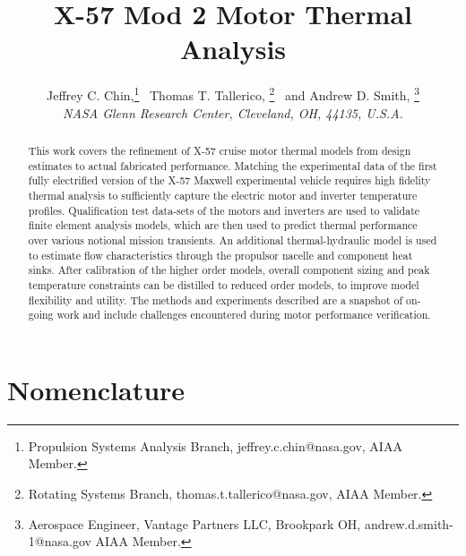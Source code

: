 \documentclass[]{aiaa-tc}%
\title{X-57 Mod 2 Motor Thermal Analysis}
\author{
  Jeffrey C. Chin,\thanks{Propulsion Systems Analysis Branch, jeffrey.c.chin@nasa.gov, AIAA Member.} \
  Thomas T. Tallerico, \thanks{Rotating Systems Branch, thomas.t.tallerico@nasa.gov, AIAA Member.} \
  and Andrew D. Smith, \thanks{Aerospace Engineer, Vantage Partners LLC, Brookpark OH, andrew.d.smith-1@nasa.gov AIAA Member.} \\
  {\normalsize \itshape NASA Glenn Research Center, Cleveland, OH, 44135, U.S.A.} }
\begin{document}
\maketitle

\begin{abstract}

This work covers the refinement of X-57 cruise motor thermal models from design estimates to actual fabricated performance. Matching the experimental data of the first fully electrified version of the X-57 Maxwell experimental vehicle requires high fidelity thermal analysis to sufficiently capture the electric motor and inverter temperature profiles. Qualification test data-sets of the motors and inverters are used to validate finite element analysis models, which are then used to predict thermal performance over various notional mission transients. An additional thermal-hydraulic model is used to estimate flow characteristics through the propulsor nacelle and component heat sinks. After calibration of the higher order models, overall component sizing and peak temperature constraints can be distilled to reduced order models, to improve model flexibility and utility. The methods and experiments described are a snapshot of on-going work and include challenges encountered during motor performance verification.



\end{abstract}


%
\section{Nomenclature}
\end{document}
